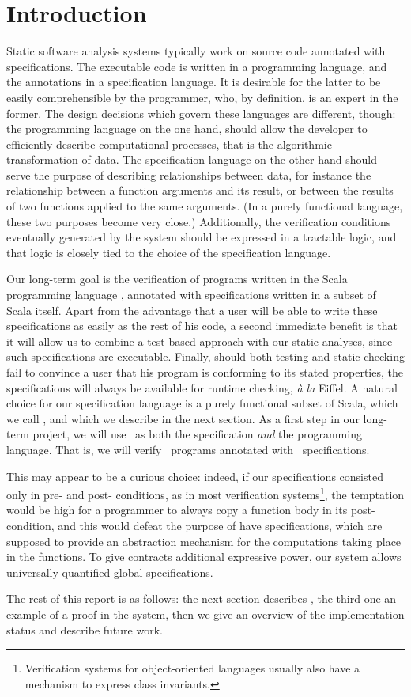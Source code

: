 \section{Introduction}
Static software analysis systems typically work on source code annotated with
specifications. The executable code is written in a programming language, and
the annotations in a specification language. It is desirable for the latter to
be easily comprehensible by the programmer, who, by definition, is an expert in
the former. The design decisions which govern these languages are different,
though: the programming language on the one hand, should allow the developer to
efficiently describe computational processes, that is the algorithmic
transformation of data. The specification language on the other hand should
serve the purpose of describing relationships between data, for instance the
relationship between a function arguments and its result, or between the
results of two functions applied to the same arguments. (In a purely functional
language, these two purposes become very close.) Additionally, the verification
conditions eventually generated by the system should be expressed in a
tractable logic, and that logic is closely tied to the choice of the
specification language.

Our long-term goal is the verification of programs written in the Scala
programming language \cite{scalalang}, annotated with specifications written in
a subset of Scala itself. Apart from the advantage that a user will be able to
write these specifications as easily as the rest of his code, a second
immediate benefit is that it will allow us to combine a test-based approach
with our static analyses, since such specifications are executable. Finally,
should both testing and static checking fail to convince a user that his
program is conforming to its stated properties, the specifications will always
be available for runtime checking, {\it \`a la} Eiffel. A natural choice for
our specification language is a purely functional subset of Scala, which we
call \purescala, and which we describe in the next section. As a first step in
our long-term project, we will use \purescala\ as both the specification
\emph{and} the programming language. That is, we will verify \purescala\
programs annotated with \purescala\ specifications.

This may appear to be a curious choice: indeed, if our specifications consisted
only in pre- and post- conditions, as in most verification
systems\footnote{Verification systems for object-oriented languages usually
also have a mechanism to express class invariants.}, the temptation would be
high for a programmer to always copy a function body in its post-condition, and
this would defeat the purpose of have specifications, which are supposed to
provide an abstraction mechanism for the computations taking place in the
functions. To give contracts additional expressive power, our system allows
universally quantified global specifications.

The rest of this report is as follows: the next section describes
{\purescala}, the third one an example of a proof in the system, then we
give an overview of the implementation status and describe future work.
